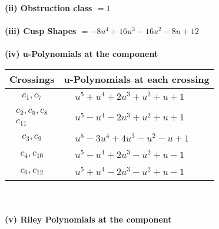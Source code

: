 \documentclass[1p]{elsarticle_modified}
\theoremstyle{definition}
\begin{document}
\flushleft \textbf{(ii) Obstruction class $= 1$}\\~\\
\flushleft \textbf{(iii) Cusp Shapes $= -8 u^4+16 u^3-16 u^2-8 u+12$}\\~\\
\newpage\renewcommand{\arraystretch}{1}
\flushleft \textbf{(iv) u-Polynomials at the component}\newline \\
\begin{tabular}{m{50pt}|m{274pt}}
Crossings & \hspace{64pt}u-Polynomials at each crossing \\
\hline $$\begin{aligned}c_{1},c_{7}\end{aligned}$$&$\begin{aligned}
&u^5+u^4+2 u^3+u^2+u+1
\end{aligned}$\\
\hline $$\begin{aligned}c_{2},c_{5},c_{8}\\c_{11}\end{aligned}$$&$\begin{aligned}
&u^5- u^4-2 u^3+u^2+u+1
\end{aligned}$\\
\hline $$\begin{aligned}c_{3},c_{9}\end{aligned}$$&$\begin{aligned}
&u^5-3 u^4+4 u^3- u^2- u+1
\end{aligned}$\\
\hline $$\begin{aligned}c_{4},c_{10}\end{aligned}$$&$\begin{aligned}
&u^5- u^4+2 u^3- u^2+u-1
\end{aligned}$\\
\hline $$\begin{aligned}c_{6},c_{12}\end{aligned}$$&$\begin{aligned}
&u^5+u^4-2 u^3- u^2+u-1
\end{aligned}$\\
\hline
\end{tabular}\\~\\
\newpage\renewcommand{\arraystretch}{1}
\flushleft \textbf{(v) Riley Polynomials at the component}\newline \\
\end{document}
